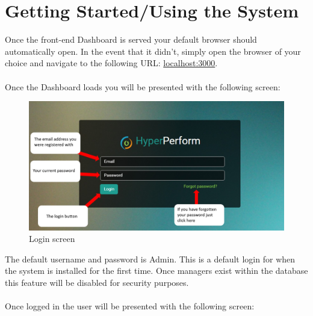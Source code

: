 \documentclass[11pt,a4paper]{article}
\begin{document}

%
%
\pagebreak
\section{Getting Started/Using the System}
Once the front-end Dashboard is served your default browser should automatically open. In the event that it didn't, simply open the browser of your choice and navigate to the following URL: \url{localhost:3000}. \\ \\
Once the Dashboard loads you will be presented with the following screen:

\begin{figure}[H]
	\begin{center}
		\includegraphics[scale=0.3]{../Images/Login_Screen.jpg}
		\caption{Login screen}
	\end{center}
\end{figure}
\noindent
The default username and password is Admin. This is a default login for when the system is installed for the first time. Once managers exist within the database this feature will be disabled for security purposes. \\ \\
Once logged in the user will be presented with the following screen:
\end{document}
